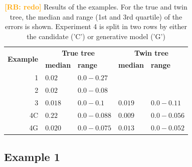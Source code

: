 \documentclass{article}
\newcommand{\richel}[1]{\textcolor{orange}{\textbf{[RB: #1]}}}
\begin{document}
\begin{table}[h]
\centering
\begin{tabular}{ | r | l | l | l | l | }
\hline
\multirow{2}{*}{\textbf{Example}} & \multicolumn{2}{c|}{\textbf{True tree}} 
                                  & \multicolumn{2}{c|}{\textbf{Twin tree}} \\
\cline{2-5}
                                  & \textbf{median} & \textbf{range} & \textbf{median} & \textbf{range} \\
\hline
1  & $0.02$  & $0.0 - 0.27$  &         &               \\
2  & $0.02$  & $0.0 - 0.08$  &         &               \\
3  & $0.018$ & $0.0 - 0.1$   & $0.019$ & $0.0 - 0.11$  \\
4C & $0.22$  & $0.0 - 0.088$ & $0.009$ & $0.0 - 0.056$ \\
4G & $0.020$ & $0.0 - 0.075$ & $0.013$ & $0.0 - 0.052$ \\
\hline
\end{tabular}
\caption{
  \richel{redo}
  Results of the examples. 
  For the true and twin tree,
  the median and range (1st and 3rd quartile) of the errors 
  is shown. Experiment 4 is split in two rows
  by either the candidate ('C') or generative model ('G')
}
\label{tab:results}
\end{table}

\subsection{Example 1}
\end{document}

